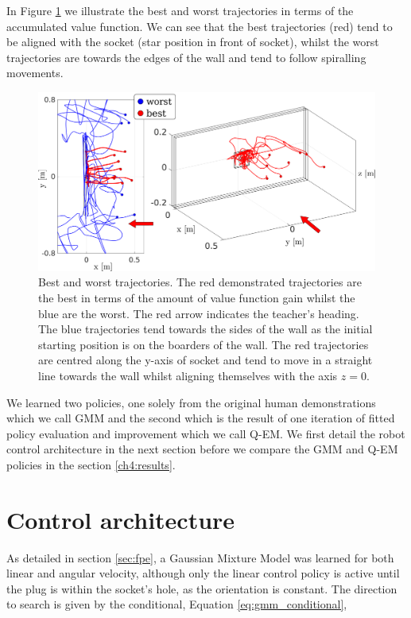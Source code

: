 In Figure \ref{fig:best_worst_traj} we illustrate the best and worst trajectories in terms of the accumulated value function.
We can see that the best trajectories (red) tend to be aligned with the socket (star position in front of socket), 
whilst the worst trajectories are towards the edges of the wall and tend to follow spiralling movements. 

\begin{figure}
 \centering
 \includegraphics[width=\textwidth]{./ch4-PiH/Figures/ValueFunction/value_func_final_v3.pdf}
 \caption{Best and worst trajectories. The red demonstrated trajectories are the best in terms of the amount of value function 
 gain whilst the blue are the worst. The red arrow indicates the teacher's heading. The blue trajectories tend 
 towards the sides of the wall as the initial starting position is on the boarders of the wall. The red trajectories are centred along the y-axis of socket and tend to move in a straight line towards 
 the wall whilst aligning themselves with the axis $z=0$.} 
 \label{fig:best_worst_traj}
\end{figure}


We learned two policies, one solely from the original human demonstrations which we call GMM and the second which 
is the result of one iteration of fitted policy evaluation and improvement which we call Q-EM. We first detail 
the robot control architecture in the next section before we compare the GMM and Q-EM policies in the section \ref{ch4:results}.

\section{Control architecture}\label{ch4:control_architecture}

As detailed in section \ref{sec:fpe}, a Gaussian Mixture Model was learned for both linear and angular velocity,
although only the linear control policy is active until the plug is within 
the socket's hole, as the orientation is constant.
The direction to search is given by the conditional, Equation \ref{eq:gmm_conditional},


